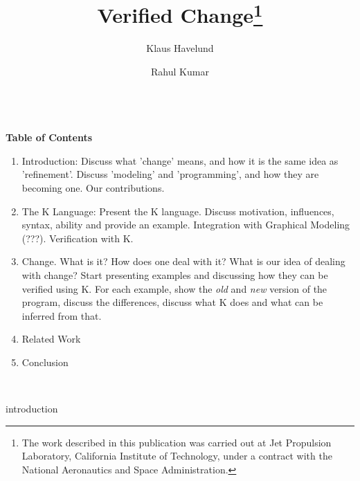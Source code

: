 \documentclass{llncs}
\title{Verified Change\thanks{
  The work described in this publication was carried out at Jet Propulsion
  Laboratory, California Institute of Technology, under a contract with
  the National Aeronautics and Space Administration.}}
\author{Klaus Havelund \and Rahul Kumar}
\institute{
  Jet Propulsion Laboratory\\
  California Institute of Technology\\
  California, USA
}
\begin{document}
\maketitle




\vspace{1cm}
\color{red}
\noindent\makebox[\linewidth]{\rule{\paperwidth}{0.4pt}}\\

{\bf Table of Contents}

\begin{enumerate}
  \item Introduction: Discuss what 'change' means, and how it is the
    same idea as 'refinement'. Discuss 'modeling' and 'programming',
    and how they are becoming one. Our contributions. 
  \item The K Language: Present the K language. Discuss motivation,
    influences, syntax, ability and provide an example. Integration
    with Graphical Modeling (???). Verification with K.
  \item Change. What is it? How does one deal with it? What is our
    idea of dealing with change? Start presenting examples and
    discussing how they can be verified using K. For each example,
    show the \emph{old} and \emph{new} version of the program, discuss
    the differences, discuss what K does and what can be inferred from
    that.
  \item Related Work
  \item Conclusion
\end{enumerate}

\noindent\makebox[\linewidth]{\rule{\paperwidth}{0.4pt}}\\
\color{black}
\vspace{1cm}


 	{introduction}









\end{document}
